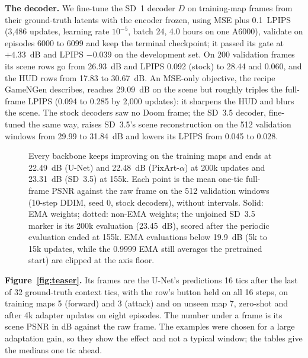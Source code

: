 \textbf{The decoder.} We fine-tune the SD~1 decoder $D$ on training-map frames from their ground-truth latents with the encoder frozen, using MSE plus 0.1~LPIPS (3,486 updates, learning rate $10^{-5}$, batch 24, 4.0 hours on one A6000), validate on episodes 6000 to 6099 and keep the terminal checkpoint; it passed its gate at $+4.33$~dB and LPIPS $-0.039$ on the development set. On 200 validation frames its scene rows go from 26.93~dB and LPIPS 0.092 (stock) to 28.44 and 0.060, and the HUD rows from 17.83 to 30.67~dB. An MSE-only objective, the recipe GameNGen describes, reaches 29.09~dB on the scene but roughly triples the full-frame LPIPS (0.094 to 0.285 by 2,000 updates): it sharpens the HUD and blurs the scene. The stock decoders saw no Doom frame; the SD~3.5 decoder, fine-tuned the same way, raises SD~3.5's scene reconstruction on the 512 validation windows from 29.99 to 31.84~dB and lowers its LPIPS from 0.045 to 0.028.

\begin{figure}[ht]
\centering
{}
\caption{Every backbone keeps improving on the training maps and ends at 22.49~dB (U-Net) and 22.48~dB (PixArt-$\alpha$) at 200k updates and 23.31~dB (SD~3.5) at 155k. Each point is the mean one-tic full-frame PSNR against the raw frame on the 512 validation windows (10-step DDIM, seed 0, stock decoders), without intervals. Solid: EMA weights; dotted: non-EMA weights; the unjoined SD~3.5 marker is its 200k evaluation (23.45~dB), scored after the periodic evaluation ended at 155k. EMA evaluations below 19.9~dB (5k to 15k updates, while the 0.9999 EMA still averages the pretrained start) are clipped at the axis floor.}
\label{fig:training-curves}
\end{figure}

\textbf{Figure~\ref{fig:teaser}.} Its frames are the U-Net's predictions 16 tics after the last of 32 ground-truth context tics, with the row's button held on all 16 steps, on training maps 5 (forward) and 3 (attack) and on unseen map 7, zero-shot and after 4k adapter updates on eight episodes. The number under a frame is its scene PSNR in dB against the raw frame. The examples were chosen for a large adaptation gain, so they show the effect and not a typical window; the tables give the medians one tic ahead.

